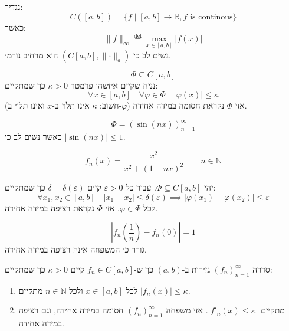 \documentclass{tstextbook}
\begin{document}
\begin{definition}
נגדיר:
$$C([a,b])=\{ f\mid [a,b]\to \mathbb{R}, f \text{ is continous} \}$$
כאשר:
$$\lVert f \rVert _{\infty} \overset{\text{def}}{=} \max _{x \in [a,b]} \lvert f(x) \rvert $$
נשים לב כי \((C[a,b],\lVert \cdot \rVert_{a})\) הוא מרחיב נורמי.

\end{definition}
\begin{definition}
$$\Phi \subseteq C[a,b]$$
נניח שקיים איזשהו פרמטר \(\kappa > 0\) כך שמתקיים:
$$\forall x \in [a,b]\quad \forall \varphi \in \Phi \quad \lvert \varphi(x) \rvert \leq \kappa$$
(חשוב: \(\kappa\) אינו תלוי ב-\(x\) ואינו תלוי ב-\(\varphi\)) אזי \(\Phi\) נקראת חסומה במידה אחידה.

\end{definition}
\begin{example}
$$\Phi=(\sin(nx))_{n=1}^{\infty}$$
כאשר נשים לב כי \(\lvert \sin(nx) \rvert\leq 1\).

\end{example}
\begin{example}
$$f_{n}(x)= \frac{x^{2}}{x^{2}+(1-nx)^{2}}\qquad  n \in \mathbb{N}$$

\end{example}
\begin{definition}
יהי \(\Phi \subseteq C[a,b]\). עבור כל \(\varepsilon > 0\) קיים \(\delta=\delta(\varepsilon)\) כך שמתקיים:
$$\forall x_{1},x_{2} \in [a,b]\quad \lvert x_{1}-x_{2} \rvert \leq  \delta(\varepsilon)\implies \lvert \varphi(x_{1})-\varphi(x_{2}) \rvert \leq  \varepsilon$$
לכל \(\varphi \in \Phi\). אזי \(\Phi\) נקראת רציפה במידה אחידה.

\end{definition}
\begin{example}
$$\left\lvert  f_{n}\left( \frac{1}{n} \right)-f_{n}(0)  \right\rvert =1$$
גורר כי המשפחה אינה רציפה במידה אחידה.

\end{example}
\begin{example}
סדרה \((f_{n})_{n=1}^{\infty}\) גזירות ב-\((a,b)\) כך ש-\(f_{n}\in C[a,b]\) קיים \(\kappa > 0\) כך שמתקיים:

  \begin{enumerate}
    \item לכל \(x \in [a,b]\) ולכל \(n \in \mathbb{N}\) מתקיים \(\lvert f_{n}(x) \rvert\leq \kappa\). 


    \item מתקיים \(\lvert f'_{n}(x)\leq \kappa \rvert\). 
אזי משפחה \((f_{n})_{n=1}^{\infty}\) חסומה במידה אחידה, וגם רציפה במידה אחידה.


  \end{enumerate}
\end{example}
\end{document}
